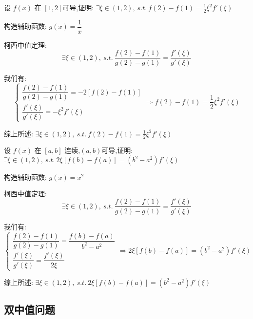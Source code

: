 \begin{proposition}
	设 $f(x)$ 在 $[1,2]$可导,证明: $\exists \xi\in(1,2),\ s.t.\ f(2)-f(1)=\frac{1}{2}\xi^2f'(\xi)$
\end{proposition}
\begin{solution}

	构造辅助函数: $g(x)=\dfrac{1}{x}$

	柯西中值定理:
	$$\exists\xi\in(1,2),\ s.t.\ \dfrac{f(2)-f(1)}{g(2)-g(1)}=\dfrac{f'(\xi)}{g'(\xi)}$$

	我们有:
	$$\begin{cases}
		\dfrac{f(2)-f(1)}{g(2)-g(1)}=-2[f(2)-f(1)] \\
		\dfrac{f'(\xi)}{g'(\xi)}=-\xi^2f'(\xi)
	\end{cases}\Rightarrow f(2)-f(1)=\frac{1}{2}\xi^2f'(\xi)$$

	综上所述: $\exists \xi\in(1,2),\ s.t.\ f(2)-f(1)=\frac{1}{2}\xi^2f'(\xi)$
\end{solution}

\begin{proposition}
	设 $f(x)$ 在 $[a,b]$ 连续,$(a,b)$可导,证明: $\exists \xi\in(1,2),\ s.t.\ 2\xi[f(b)-f(a)]=(b^2-a^2)f'(\xi)$
\end{proposition}
\begin{solution}

	构造辅助函数: $g(x)=x^2$

	柯西中值定理:
	$$\exists\xi\in(1,2),\ s.t.\ \dfrac{f(2)-f(1)}{g(2)-g(1)}=\dfrac{f'(\xi)}{g'(\xi)}$$

	我们有:
	$$\begin{cases}
		\dfrac{f(2)-f(1)}{g(2)-g(1)}=\dfrac{f(b)-f(a)}{b^2-a^2} \\
		\dfrac{f'(\xi)}{g'(\xi)}=\dfrac{f'(\xi)}{2\xi}
	\end{cases} \Rightarrow 2\xi[f(b)-f(a)]=(b^2-a^2)f'(\xi)$$

	综上所述: $\exists \xi\in(1,2),\ s.t.\ 2\xi[f(b)-f(a)]=(b^2-a^2)f'(\xi)$
\end{solution}

\subsection{双中值问题}

